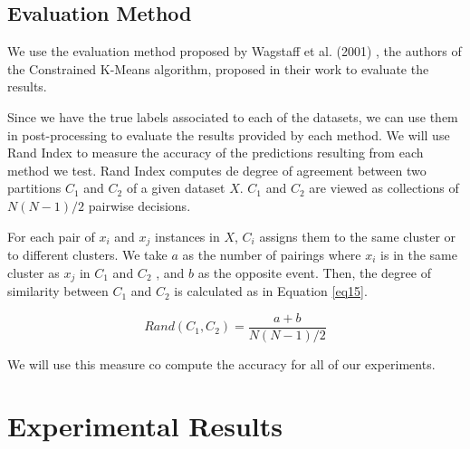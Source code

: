 \documentclass[review]{elsarticle}
\begin{document}
\subsection{Evaluation Method}

We use the evaluation method proposed by Wagstaff et al. (2001) \cite{wagstaff2001constrained}, the authors of the Constrained K-Means algorithm, proposed in their work to evaluate the results.

Since we have the true labels associated to each of the datasets, we can use them in post-processing to evaluate the results provided by each method. We will use Rand Index \cite{rand1971objective} to measure the accuracy of the predictions resulting from each method we test. Rand Index computes de degree of agreement between two partitions $C_1$ and $C_2$ of a given dataset $X$. $C_1$ and $C_2$ are viewed as collections of $N(N - 1)/2$ pairwise decisions.

For each pair of $x_i$ and $x_j$ instances in $X$, $C_i$ assigns them to the same cluster or to different clusters. We take $a$ as the number of pairings where $x_i$ is in the same cluster as $x_j$ in $C_1$ and $C_2$ , and $b$ as the opposite event. Then, the degree of similarity between $C_1$ and $C_2$ is calculated as in Equation \eqref{eq15}.

\begin{equation}
Rand(C_1, C_2) = \frac{a + b}{N(N - 1)/2}
\label{eq15}
\end{equation}

We will use this measure co compute the accuracy for all of our experiments.

\section{Experimental Results}

\begin{table}[!h]
	\centering
	\setlength{\tabcolsep}{7pt}
	\renewcommand{\arraystretch}{0.9}
		
	\caption{Experimental results obtained with X\% of labeled data}
	\label{undefined}
\end{table}
	
\end{document}
